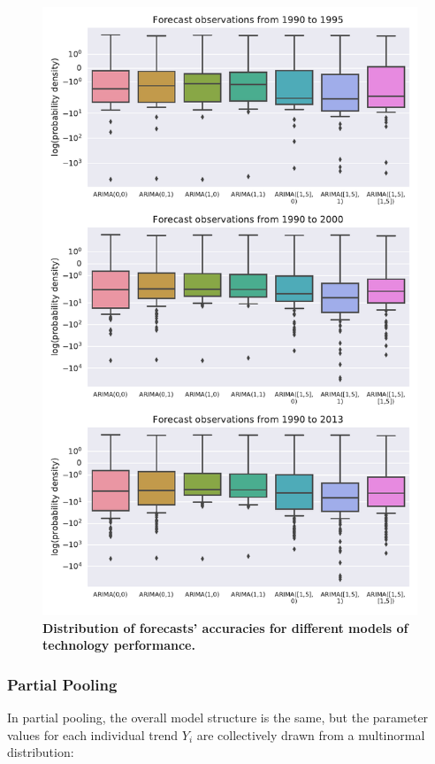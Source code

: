 \documentclass{article}
\begin{document}
\begin{figure}
    \centering
    \includegraphics[height=.75\textheight]{figs/Separate_Models_Forecast_Quality_Performance.pdf}
    \caption{\textbf{Distribution of forecasts' accuracies for different models of technology performance.}}
    \label{fig:Separate_Models_Forecast_Quality_Performance}
\end{figure}

\subsubsection{Partial Pooling}
In partial pooling, the overall model structure is the same, but the parameter values for each individual trend $Y_{i}$ are collectively drawn from a multinormal distribution:
\end{document}
